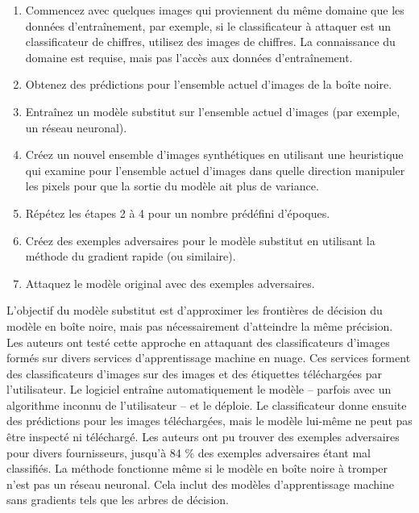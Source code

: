 \begin{enumerate}
    \item Commencez avec quelques images qui proviennent du même domaine que les données d'entraînement, par exemple, si le classificateur à attaquer est un classificateur de chiffres, utilisez des images de chiffres. La connaissance du domaine est requise, mais pas l'accès aux données d'entraînement.
    \item Obtenez des prédictions pour l'ensemble actuel d'images de la boîte noire.
    \item Entraînez un modèle substitut sur l'ensemble actuel d'images (par exemple, un réseau neuronal).
    \item Créez un nouvel ensemble d'images synthétiques en utilisant une heuristique qui examine pour l'ensemble actuel d'images dans quelle direction manipuler les pixels pour que la sortie du modèle ait plus de variance.
    \item Répétez les étapes 2 à 4 pour un nombre prédéfini d'époques.
    \item Créez des exemples adversaires pour le modèle substitut en utilisant la méthode du gradient rapide (ou similaire).
    \item Attaquez le modèle original avec des exemples adversaires.
\end{enumerate}

L'objectif du modèle substitut est d'approximer les frontières de décision du modèle en boîte noire, mais pas nécessairement d'atteindre la même précision.
Les auteurs ont testé cette approche en attaquant des classificateurs d'images formés sur divers services d'apprentissage machine en nuage. Ces services forment des classificateurs d'images sur des images et des étiquettes téléchargées par l'utilisateur.
Le logiciel entraîne automatiquement le modèle -- parfois avec un algorithme inconnu de l'utilisateur -- et le déploie.
Le classificateur donne ensuite des prédictions pour les images téléchargées, mais le modèle lui-même ne peut pas être inspecté ni téléchargé.
Les auteurs ont pu trouver des exemples adversaires pour divers fournisseurs, jusqu'à 84 \% des exemples adversaires étant mal classifiés.
La méthode fonctionne même si le modèle en boîte noire à tromper n'est pas un réseau neuronal. Cela inclut des modèles d'apprentissage machine sans gradients tels que les arbres de décision.


